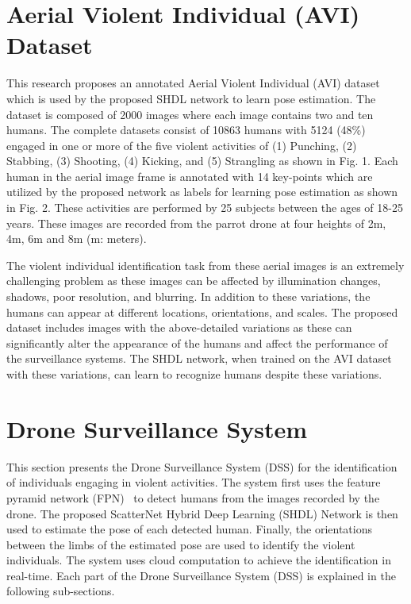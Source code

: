 \documentclass[10pt,twocolumn,letterpaper]{article}
\begin{document}
\section{Aerial Violent Individual (AVI) Dataset}
This research proposes an annotated Aerial Violent Individual (AVI) dataset which is used by the proposed SHDL network to learn pose estimation. The dataset is composed of 2000 images where each image contains two and ten humans. The complete datasets consist of 10863 humans with 5124 (48\%) engaged in one or more of the five violent activities of  (1) Punching, (2) Stabbing, (3) Shooting, (4) Kicking, and (5) Strangling as shown in Fig. 1. Each human in the aerial image frame is annotated with 14 key-points which are utilized by the proposed network as labels for learning pose estimation as shown in Fig. 2. These activities are performed by 25 subjects between the ages of 18-25 years. These images are recorded from the parrot drone at four heights of 2m, 4m, 6m and 8m (m: meters). 

The violent individual identification task from these aerial images is an extremely challenging problem as these images can be affected by illumination changes, shadows, poor resolution, and blurring. In addition to these variations, the humans can appear at different locations, orientations, and scales. The proposed dataset includes images with the above-detailed variations as these can significantly alter the appearance of the humans and affect the performance of the surveillance systems. The SHDL network, when trained on the AVI dataset with these variations, can learn to recognize humans despite these variations. 

\section{Drone Surveillance System}
This section presents the Drone Surveillance System (DSS) for the identification of individuals engaging in violent activities. The system first uses the feature pyramid network (FPN)~\cite{hd} to detect humans from the images recorded by the drone. The proposed ScatterNet Hybrid Deep Learning (SHDL) Network is then used to estimate the pose of each detected human. Finally, the orientations between the limbs of the estimated pose are used to identify the violent individuals. The system uses cloud computation to achieve the identification in real-time. Each part of the Drone Surveillance System (DSS) is explained in the following sub-sections.
\end{document}
